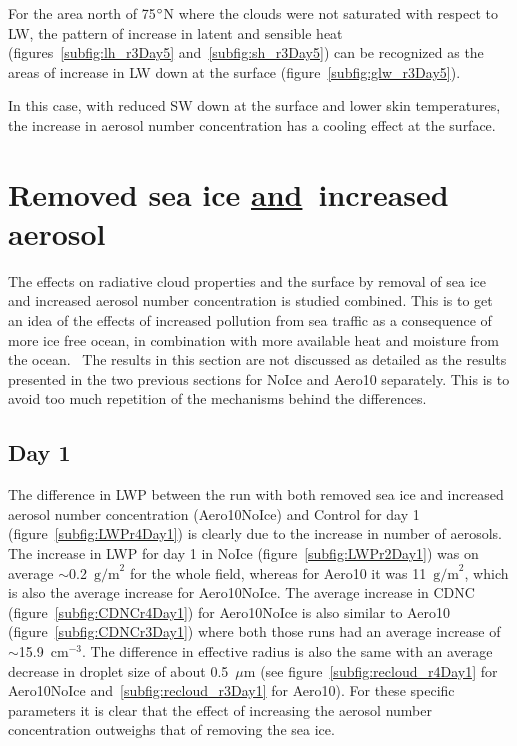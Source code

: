 For the area north of 75$\degree$N where the clouds were not saturated with respect to LW, the pattern of increase in latent and sensible heat (figures~\ref{subfig:lh_r3Day5} and~\ref{subfig:sh_r3Day5}) can be recognized as the areas of increase in LW down at the surface (figure~\ref{subfig:glw_r3Day5}).

In this case, with reduced SW down at the surface and lower skin temperatures, the increase in aerosol number concentration has a cooling effect at the surface.

\clearpage
\section{Removed sea ice \underline{and}~increased aerosol}
The effects on radiative cloud properties and the surface by removal of sea ice and increased aerosol number concentration is studied combined. This is to get an idea of the effects of increased pollution from sea traffic as a consequence of more ice free ocean, in combination with more available heat and moisture from the ocean.%
~The results in this section are not discussed as detailed as the results presented in the two previous sections for NoIce and Aero10 separately. This is to avoid too much repetition of the mechanisms behind the differences.

\subsection{Day 1}
The difference in LWP between the run with both removed sea ice and increased aerosol number concentration (Aero10NoIce) and Control for day 1 (figure~\ref{subfig:LWPr4Day1}) is clearly due to the increase in number of aerosols. The increase in LWP for day 1 in NoIce (figure~\ref{subfig:LWPr2Day1}) was on average $\sim$0.2~$\text{g/m}^2$ for the whole field, whereas for Aero10 it was 11~$\text{g/m}^2$, which is also the average increase for Aero10NoIce. The average increase in CDNC (figure~\ref{subfig:CDNCr4Day1}) for Aero10NoIce is also similar to Aero10 (figure~\ref{subfig:CDNCr3Day1}) where both those runs had an average increase of $\sim$15.9~$\text{cm}^{-3}$. The difference in effective radius is also the same with an average decrease in droplet size of about 0.5~$\mu\text{m}$ (see figure~\ref{subfig:recloud_r4Day1} for Aero10NoIce and~\ref{subfig:recloud_r3Day1} for Aero10). For these specific parameters it is clear that the effect of increasing the aerosol number concentration outweighs that of removing the sea ice.

